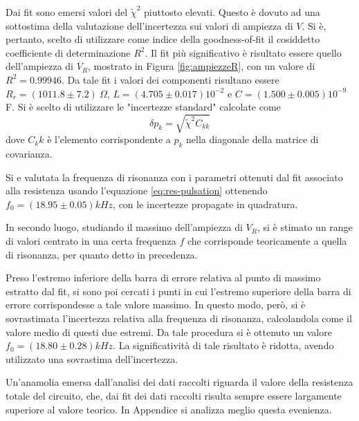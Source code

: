 Dai fit sono emersi valori del $\tilde{\chi}^2$ piuttosto elevati. Questo è dovuto ad una sottostima della valutazione
dell'incertezza sui valori di ampiezza di $V$. Si è, pertanto, scelto di utilizzare come indice della goodness-of-fit
il cosiddetto coefficiente di determinazione $R^2$.
Il fit più significativo è risultato essere quello dell'ampiezza di $V_R$, mostrato in Figura \ref{fig:ampiezzeR}, con
un valore di $R^2 = 0.99946$. Da tale fit i valori dei componenti risultano essere $R_r = (1011.8 \pm 7.2) \ \Omega$,
$L = (4.705 \pm 0.017)10^{-2}$ e $C = (1.500 \pm 0.005)10^{-9}$ F. Si è scelto di utilizzare le "incertezze
standard" calcolate come
\[
    \delta p_k = \sqrt{\tilde{\chi}^2 C_{kk}}
\]
dove $C_kk$ è l'elemento corrispondente a $p_k$ nella diagonale della matrice di covarianza.

Si e valutata la frequenza di risonanza con i parametri ottenuti dal fit associato alla resistenza usando l'equazione
\ref{eq:res-pulsation} ottenendo $f_0 = (18.95 \pm 0.05) kHz$, con le incertezze propagate in quadratura.

In secondo luogo, studiando il massimo dell'ampiezza di $V_R$, si è stimato un range di valori centrato in
una certa frequenza $f$ che corrisponde teoricamente a quella di risonanza, per quanto detto in precedenza.


Preso l’estremo inferiore della barra di errore relativa al punto di massimo estratto dal fit, si sono poi cercati i
punti in cui l’estremo superiore della barra di errore corrispondesse a tale valore massimo. In questo modo, però, si
è sovrastimata l’incertezza relativa alla frequenza di risonanza, calcolandola come il valore medio di questi due estremi.
Da tale procedura si è ottenuto un valore $f_0 = (18.80 \pm 0.28)kHz$.
La significatività di tale risultato è ridotta, avendo utilizzato una sovrastima dell'incertezza.

Un'anamolia emersa dall'analisi dei dati raccolti riguarda il valore della resistenza totale del circuito, che, dai fit
dei dati raccolti risulta sempre essere largamente superiore al valore teorico. In Appendice si analizza meglio questa
evenienza.

